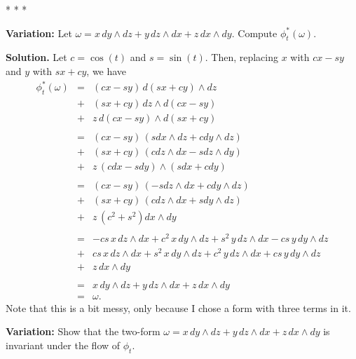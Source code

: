 \documentclass[10pt]{article}
\numberwithin{equation}{subsection}
\begin{document}
\begin{center}* * *\end{center}

\textbf{Variation:}  Let $\omega = x\,dy\wedge dz +
y\,dz\wedge dx + z\, dx\wedge dy$.  Compute $\phi_t^*(\omega)$.

\textbf{Solution.}  Let $c=\cos(t)$ and $s=\sin(t)$.  Then, replacing $x$ with
$cx-sy$ and $y$ with $sx+cy$, we have
\begin{eqnarray*}
	\phi_t^*(\omega)
		&=& (cx-sy)\, d(sx+cy)\wedge dz \\
		&+& (sx+cy)\, dz\wedge d(cx-sy) \\
		&+& z\, d(cx-sy)\wedge d(sx+cy) \\
	&&\\
		&=& (cx-sy)\, (sdx\wedge dz +c dy\wedge dz) \\
		&+& (sx+cy)\, (c dz\wedge dx - s dz \wedge dy) \\
		&+& z\, (cdx-sdy)\wedge (sdx+cdy) \\
	&&\\
		&=& (cx-sy)\, (-sdz\wedge dx +c dy\wedge dz) \\
		&+& (sx+cy)\, (c dz\wedge dx + s dy \wedge dz) \\
		&+& z\,(c^2+s^2) dx \wedge dy \\
	&&\\
		&=& -cs\,x\, dz\wedge dx
		+c^2\,x\, dy \wedge dz
		+s^2\,y\, dz \wedge dx
		-cs\,y\, dy\wedge dz \\
	&+& cs\,x\, dz\wedge dx
		+s^2\,x\, dy \wedge dz
		+c^2\,y\, dz \wedge dx
		+cs\,y\, dy\wedge dz \\
		&+& z\, dx \wedge dy \\
	&&\\
		&=& x\, dy \wedge dz +y\, dz \wedge dx + z\, dx \wedge dy \\
	&=& \omega.
\end{eqnarray*}
Note that this is a bit messy, only because I chose a form with three terms in
it.

\textbf{Variation:}  Show that the two-form $\omega = x\,dy\wedge dz +
y\,dz\wedge dx + z\, dx\wedge dy$ is invariant under the flow of $\phi_t$.
\end{document}
